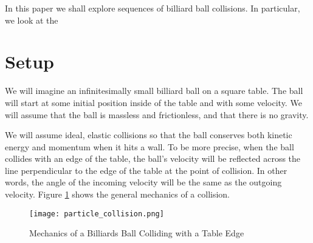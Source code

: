 In this paper we shall explore sequences of billiard ball collisions. In particular, we look at the 

\section{Setup}

We will imagine an infinitesimally small billiard ball on a square table. The ball will start at some initial position inside of the table and with some velocity. We will assume that the ball is massless and frictionless, and that there is no gravity.

We will assume ideal, elastic collisions so that the ball conserves both kinetic energy and momentum when it hits a wall. To be more precise, when the ball collides with an edge of the table, the ball's velocity will be reflected across the line perpendicular to the edge of the table at the point of collision. In other words, the angle of the incoming velocity will be the same as the outgoing velocity. Figure \ref{fig:collision-angle} shows the general mechanics of a collision.

\begin{figure}
  \texttt{[image: particle\_collision.png]}
  \caption{\label{fig:collision-angle}Mechanics of a Billiards Ball Colliding with a Table Edge}
\end{figure}
